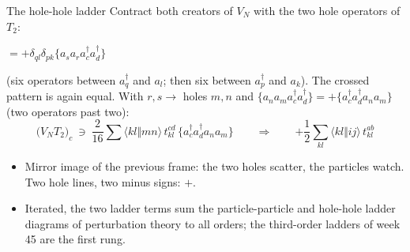 \documentclass[aspectratio=169,10pt]{beamer}
\newcommand{\cre}[1]{a_{#1}^{\dagger}}
\newcommand{\ann}[1]{a_{#1}}
\newcommand{\no}[1]{\bigl\{#1\bigr\}}
\newcommand{\as}[4]{\langle #1#2\Vert #3#4\rangle}
\begin{document}
\begin{frame}{The hole-hole ladder}
\small
Contract both creators of $V_N$ with the two hole operators of $T_2$:
\begin{center}
$=+\delta_{ql}\delta_{pk}\no{\ann s\ann r\cre c\cre d}$
\end{center}
(six operators between $\cre q$ and $\ann l$; then six between $\cre p$ and $\ann k$). The crossed pattern is again equal. With $r,s\to$ holes $m,n$ and $\no{\ann n\ann m\cre c\cre d}=+\no{\cre c\cre d\ann n\ann m}$ (two operators past two):
\[
 \bigl(V_NT_2\bigr)_c\ \ni\ \frac{2}{16}\sum\as klmn\,t_{kl}^{cd}\,\no{\cre c\cre d\ann n\ann m}
 \qquad\Longrightarrow\qquad
 \boxed{+\frac12\sum_{kl}\as klij\,t_{kl}^{ab}}
\]
\begin{itemize}
\item Mirror image of the previous frame: the two holes scatter, the particles watch. Two hole lines, two minus signs: $+$.
\item Iterated, the two ladder terms sum the particle-particle and hole-hole ladder diagrams of perturbation theory to all orders; the third-order ladders of week 45 are the first rung.
\end{itemize}
\end{frame}
\end{document}
